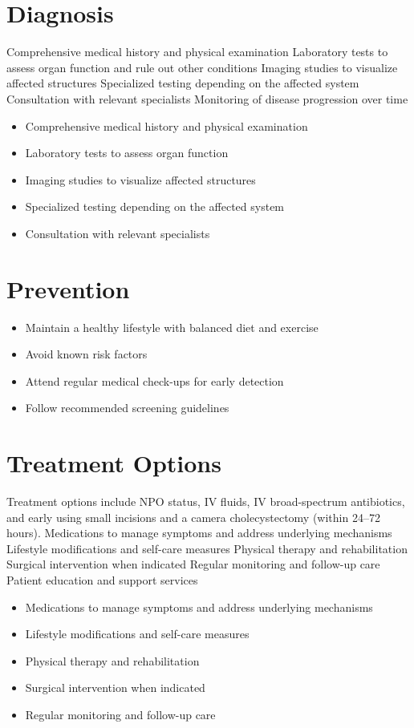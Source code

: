 \section{Diagnosis}
Comprehensive medical history and physical examination Laboratory tests to assess organ function and rule out other conditions Imaging studies to visualize affected structures Specialized testing depending on the affected system Consultation with relevant specialists Monitoring of disease progression over time

\begin{itemize}[noitemsep]
  \item Comprehensive medical history and physical examination
  \item Laboratory tests to assess organ function
  \item Imaging studies to visualize affected structures
  \item Specialized testing depending on the affected system
  \item Consultation with relevant specialists
\end{itemize}
\section{Prevention}
\begin{itemize}[noitemsep]
  \item Maintain a healthy lifestyle with balanced diet and exercise
  \item Avoid known risk factors
  \item Attend regular medical check-ups for early detection
  \item Follow recommended screening guidelines
\end{itemize}
\section{Treatment Options}
Treatment options include NPO status, IV fluids, IV broad-spectrum antibiotics, and early using small incisions and a camera cholecystectomy (within 24--72 hours). Medications to manage symptoms and address underlying mechanisms Lifestyle modifications and self-care measures Physical therapy and rehabilitation Surgical intervention when indicated Regular monitoring and follow-up care Patient education and support services

\begin{itemize}[noitemsep]
  \item Medications to manage symptoms and address underlying mechanisms
  \item Lifestyle modifications and self-care measures
  \item Physical therapy and rehabilitation
  \item Surgical intervention when indicated
  \item Regular monitoring and follow-up care
\end{itemize}
